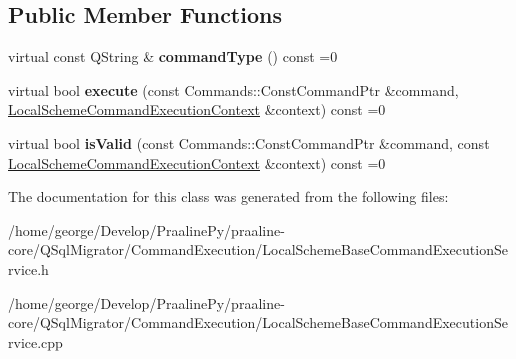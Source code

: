 \subsection*{Public Member Functions}
\begin{DoxyCompactItemize}
\item 
\mbox{\label{class_q_sql_migrator_1_1_command_execution_1_1_local_scheme_base_command_execution_service_a7431780ff51ea6a76ac1105d4d91a094}} 
virtual const Q\+String \& {\bfseries command\+Type} () const =0
\item 
\mbox{\label{class_q_sql_migrator_1_1_command_execution_1_1_local_scheme_base_command_execution_service_ad2c06aac732b5ae004c5756eb46d156d}} 
virtual bool {\bfseries execute} (const Commands\+::\+Const\+Command\+Ptr \&command, \hyperlink{class_q_sql_migrator_1_1_command_execution_1_1_local_scheme_command_execution_context}{Local\+Scheme\+Command\+Execution\+Context} \&context) const =0
\item 
\mbox{\label{class_q_sql_migrator_1_1_command_execution_1_1_local_scheme_base_command_execution_service_a4e60c3cad7c971aeb2b93f93a4a94828}} 
virtual bool {\bfseries is\+Valid} (const Commands\+::\+Const\+Command\+Ptr \&command, const \hyperlink{class_q_sql_migrator_1_1_command_execution_1_1_local_scheme_command_execution_context}{Local\+Scheme\+Command\+Execution\+Context} \&context) const =0
\end{DoxyCompactItemize}


The documentation for this class was generated from the following files\+:\begin{DoxyCompactItemize}
\item 
/home/george/\+Develop/\+Praaline\+Py/praaline-\/core/\+Q\+Sql\+Migrator/\+Command\+Execution/Local\+Scheme\+Base\+Command\+Execution\+Service.\+h\item 
/home/george/\+Develop/\+Praaline\+Py/praaline-\/core/\+Q\+Sql\+Migrator/\+Command\+Execution/Local\+Scheme\+Base\+Command\+Execution\+Service.\+cpp\end{DoxyCompactItemize}
